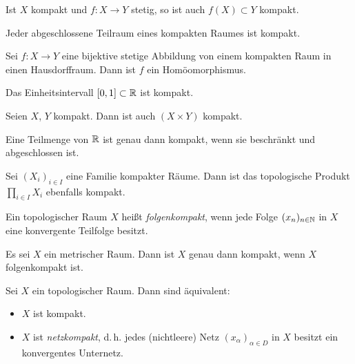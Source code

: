 \documentclass{cheat-sheet}
\begin{document}
\begin{prop}
  Ist $X$ kompakt und $f : X \to Y$ stetig, so ist auch $f(X) \subset Y$ kompakt.
\end{prop}

\begin{prop}
  Jeder abgeschlossene Teilraum eines kompakten Raumes ist kompakt.
\end{prop}

\begin{prop}
  Sei $f : X \to Y$ eine bijektive stetige Abbildung von einem kompakten Raum in einen Hausdorffraum. Dann ist $f$ ein Homöomorphismus.
\end{prop}


\begin{prop}
  Das Einheitsintervall $\left[ 0, 1 \right] \subset \mathbb{R}$ ist kompakt.
\end{prop}

\begin{prop}
  Seien $X$, $Y$ kompakt. Dann ist auch $(X \times Y)$ kompakt.
\end{prop}

\begin{satz}
  Eine Teilmenge von $\mathbb{R}$ ist genau dann kompakt, wenn sie beschränkt und abgeschlossen ist.
\end{satz}

\begin{satz}
  Sei $(X_i)_{i \in I}$ eine Familie kompakter Räume. Dann ist das topologische Produkt $\prod_{i \in I} X_i$ ebenfalls kompakt.
\end{satz}

\begin{defn}
  Ein topologischer Raum $X$ heißt \emph{folgenkompakt}, wenn jede Folge $(x_n)_{n \in \mathbb{N}}$ in $X$ eine konvergente Teilfolge besitzt.
\end{defn}

\begin{prop}
  Es sei $X$ ein metrischer Raum. Dann ist $X$ genau dann kompakt, wenn $X$ folgenkompakt ist.
\end{prop}

\begin{prop}
  Sei $X$ ein topologischer Raum. Dann sind äquivalent:
  \begin{itemize}
    \item $X$ ist kompakt.
    \item $X$ ist \emph{netzkompakt}, d.\,h. jedes (nichtleere) Netz $(x_\alpha)_{\alpha \in D}$ in $X$ besitzt ein konvergentes Unternetz.
  \end{itemize}
\end{prop}
\end{document}
